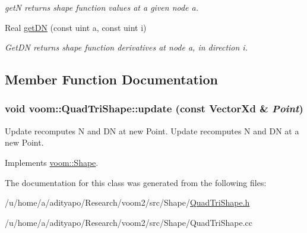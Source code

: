 \begin{DoxyCompactItemize}
\begin{DoxyCompactList}\small\item\em getN returns shape function values at a given node a. \item\end{DoxyCompactList}\item 
\hypertarget{classvoom_1_1_quad_tri_shape_aa8b93b502aee6e577ae0cc769018abea}{
Real \hyperlink{classvoom_1_1_quad_tri_shape_aa8b93b502aee6e577ae0cc769018abea}{getDN} (const uint a, const uint i)}
\label{classvoom_1_1_quad_tri_shape_aa8b93b502aee6e577ae0cc769018abea}

\begin{DoxyCompactList}\small\item\em GetDN returns shape function derivatives at node a, in direction i. \item\end{DoxyCompactList}\end{DoxyCompactItemize}


\subsection{Member Function Documentation}
\hypertarget{classvoom_1_1_quad_tri_shape_a1e0317d601f43cced80377e60db19b49}{
\subsubsection[{update}]{\setlength{\rightskip}{0pt plus 5cm}void voom::QuadTriShape::update (const VectorXd \& {\em Point})}}
\label{classvoom_1_1_quad_tri_shape_a1e0317d601f43cced80377e60db19b49}


Update recomputes N and DN at new Point. Update recomputes N and DN at a new Point. 

Implements \hyperlink{classvoom_1_1_shape_a8ded544de12647543b056cec61be9f26}{voom::Shape}.

The documentation for this class was generated from the following files:\begin{DoxyCompactItemize}
\item 
/u/home/a/adityapo/Research/voom2/src/Shape/\hyperlink{_quad_tri_shape_8h}{QuadTriShape.h}\item 
/u/home/a/adityapo/Research/voom2/src/Shape/QuadTriShape.cc\end{DoxyCompactItemize}
